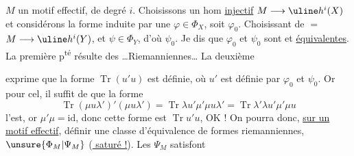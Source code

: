  
$M$ un motif effectif,  de degré $i$.
Choisissons un hom \uline{injectif} $M\longrightarrow\uline h^i(X)$
et considérons la forme induite par une $\varphi\in\Phi_X$, soit $\varphi_0$.
Choisissant de $=$ $M\longrightarrow\uline h^i(Y)$, et $\psi\in\Phi_Y$,
d'où $\psi_0$. Je dis que $\varphi_0$ et $\psi_0$ sont
 et \uline{équivalentes}.
La première p\textsuperscript{té} résulte des
 
 \ldots Riemanniennes\ldots
La deuxième 


exprime que la forme $\operatorname{Tr}(u'u)$ est définie,
où $u'$ est définie par $\varphi_0$ et $\psi_0$. Or
 pour cel, il suffit de
  que la forme
\[
\operatorname{Tr}(\mu u\lambda')'(\mu u\lambda')
=\operatorname{Tr}\lambda u'\mu'\mu u\lambda'
=\operatorname{Tr}\lambda'\lambda u'\mu'\mu u
\]
l'est, or $\mu'\mu=\mathrm{id}$,
donc cette forme est $\operatorname{Tr}u'u$, OK !
On pourra donc, \uline{sur un motif effectif}, définir une classe
d'équivalence de formes riemanniennes, 
$\unsure{\Phi_M|\Psi_M}$ (\uline{ saturé !}). Les $\Psi_M$ satisfont
